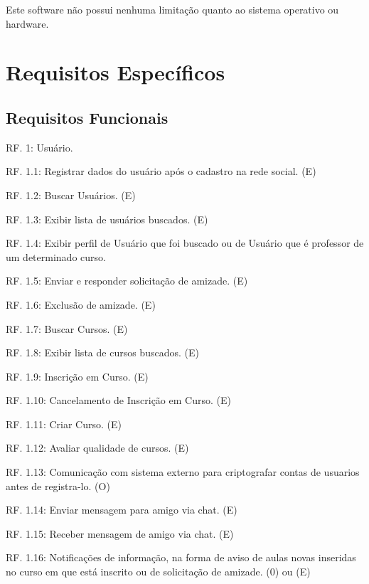 \documentclass[12pt,a4paper,onecolumn,titlepage]{article}
\begin{document}
Este software não possui nenhuma limitação quanto ao sistema operativo ou hardware.

\section{Requisitos Específicos}
\label{sect:requisitos}



\subsection{Requisitos Funcionais}

RF. 1: Usuário.


RF. 1.1: Registrar dados do usuário após o cadastro na rede social. (E)

RF. 1.2: Buscar Usuários. (E)

RF. 1.3: Exibir lista de usuários buscados. (E)

RF. 1.4: Exibir perfil de Usuário que foi buscado ou de Usuário que é professor de um determinado curso.

RF. 1.5: Enviar e responder solicitação de amizade. (E)

RF. 1.6: Exclusão de amizade. (E)

RF. 1.7: Buscar Cursos. (E)

RF. 1.8: Exibir lista de cursos buscados. (E)

RF. 1.9: Inscrição em Curso. (E)

RF. 1.10: Cancelamento de Inscrição em Curso. (E)

RF. 1.11: Criar Curso. (E)

RF. 1.12: Avaliar qualidade de cursos. (E)

RF. 1.13: Comunicação com sistema externo para criptografar contas de usuarios antes de registra-lo. (O)

RF. 1.14: Enviar mensagem para amigo via chat. (E)

RF. 1.15: Receber mensagem de amigo via chat. (E)

RF. 1.16: Notificações de informação, na forma de aviso de aulas novas inseridas no curso em que está inscrito ou de solicitação de amizade. (0) ou (E)
\end{document}
